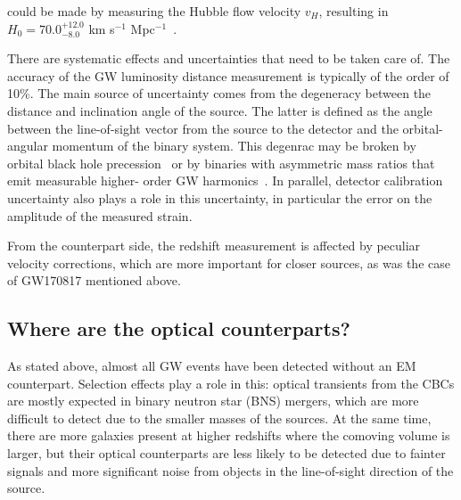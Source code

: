 \documentclass[%
preprint,
nofootinbib,
 amsmath,amssymb,
 aps,
]{revtex4-2}
\begin{document}
could be made by measuring the Hubble flow velocity $v_H$, resulting in $H_0 = 70.0^{+12.0}_{-8.0}$
km s$^{-1}$ Mpc$^{-1}$~\cite{LIGOScientific:2017adf}.

There are systematic effects and uncertainties that need to be taken care of. The accuracy of the
GW luminosity distance measurement is typically of the order of 10\%. The main source of
uncertainty comes from the degeneracy between the distance and inclination angle of the source. The
latter is defined as the angle between the line-of-sight vector from the source to the detector and
the orbital-angular momentum of the binary system. This degenrac may be broken by orbital black
hole precession~\cite{Yun_2023} or by binaries with asymmetric mass ratios that emit measurable
higher- order GW harmonics~\cite{Vitale_2018}. In parallel, detector calibration uncertainty also
plays a role in this uncertainty, in particular the error on the amplitude of the measured strain.

From the counterpart side, the redshift measurement is affected by peculiar velocity corrections,
which are more important for closer sources, as was the case of GW170817 mentioned above.

\subsection{Where are the optical counterparts?}

As stated above, almost all GW events have been detected without an EM counterpart. Selection
effects play a role in this: optical transients from the CBCs are mostly expected in binary neutron
star (BNS) mergers, which are more difficult to detect due to the smaller masses of the sources. At
the same time, there are more galaxies present at higher redshifts where the comoving volume is
larger, but their optical counterparts are less likely to be detected due to fainter signals and
more significant noise from objects in the line-of-sight direction of the source.
\end{document}
